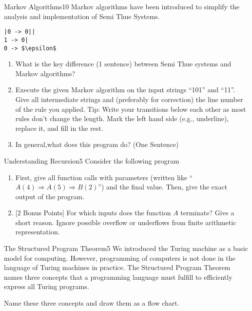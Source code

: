 \documentclass[a4paper,twoside]{article}
\begin{document}
  \begin{task}{Markov Algorithms}{10}{}
    Markov algorithms have been introduced to simplify the analysis and implementation of Semi Thue Systems.
    

    \begin{lstlisting}[mathescape,caption=A Markov Algorithm]
|0 -> 0||
1 -> 0|
0 -> $\epsilon$
      \end{lstlisting}
    
    \begin{enumerate}
    \item {What is the key difference (1 sentence) between Semi Thue systems and Markov algorithms?\vspace{2cm}}
    \item{Execute the given Markov algorithm on the input strings ``101'' and ``11''. Give all intermediate strings and (preferably for correction) the line number of the rule you applied.
      Tip: Write your transitions below each other as most rules don't change the length. Mark the left hand side (e.g., underline), replace it, and fill in the rest. \vspace{6cm}}
      \clearpage
    \item{ In general,what does this program do? (One Sentence)
      }
    \end{enumerate}
\end{task}

  \clearpage
  \begin{task}{Understanding Recursion}{5}{}
    Consider the following program
    

    \begin{enumerate}
    \item{First, give all function calls with parameters (written like ``$A(4) \Rightarrow A(5) \Rightarrow B(2)$'') and the final value. Then, give the exact output of the program.\vspace{5cm}}
    \item{[2 Bonus Points] For which inputs does the function $A$ terminate? Give a short reason. Ignore possible overflow or underflows from finite arithmetic representation.\vspace{2cm}}

    \end{enumerate}
    

  \end{task}
  \clearpage
  \begin{task}{The Structured Program Theorem}{5}{}
    We introduced the Turing machine as a basic model for computing. However, programming of computers is
    not done in the language of Turing machines in practice. The Structured Program Theorem names three concepts that
    a programming language must fulfill to efficiently express all Turing programs.

    Name these three concepts and draw them as a flow chart.
    \end{task}
    \clearpage
\end{document}
